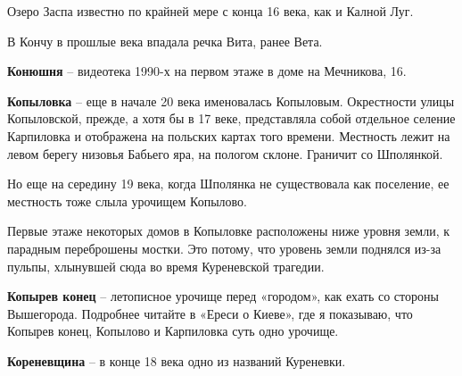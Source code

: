 Озеро Заспа известно по крайней мере с конца 16 века, как и Калной Луг.

В Кончу в прошлые века впадала речка Вита, ранее Вета.\\

\medskip

\textbf{Конюшня} – видеотека 1990-х на первом этаже в доме на Мечникова, 16.\\

\medskip

\textbf{Копыловка} – еще в начале 20 века именовалась Копыловым. Окрестности улицы Копыловской, прежде, а хотя бы в 17 веке, представляла собой отдельное селение Карпиловка и отображена на польских картах того времени. Местность лежит на левом берегу низовья Бабьего яра, на пологом склоне. Граничит со Шполянкой.

Но еще на середину 19 века, когда Шполянка не существовала как поселение, ее местность тоже слыла урочищем Копылово.

Первые этаже некоторых домов в Копыловке расположены ниже уровня земли, к парадным переброшены мостки. Это потому, что уровень земли поднялся из-за пульпы, хлынувшей сюда во время Куреневской трагедии.\\

\medskip

\textbf{Копырев конец} – летописное урочище перед «городом», как ехать со стороны Вышегорода. Подробнее читайте в «Ереси о Киеве», где я показываю, что Копырев конец, Копылово и Карпиловка суть одно урочище.\\

\medskip



\textbf{Кореневщина} – в конце 18 века одно из названий Куреневки.\\

\medskip


